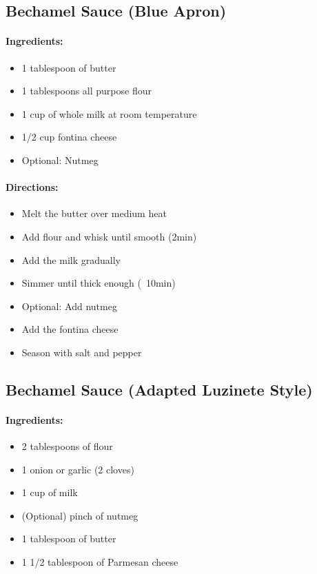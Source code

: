 \documentclass{article}
\begin{document}
\subsection{Bechamel Sauce (Blue Apron)}

\paragraph{Ingredients:}

\begin{itemize}
\item 1 tablespoon of butter
\item 1 tablespoons all purpose flour
\item 1 cup of whole milk at room temperature
\item 1/2 cup fontina cheese
\item Optional: Nutmeg
\end{itemize}

\paragraph{Directions:}
\begin{itemize}
\item Melt the butter over medium heat
\item Add flour and whisk until smooth (2min)
\item Add the milk gradually
\item Simmer until thick enough (~10min)
\item Optional: Add nutmeg
\item Add the fontina cheese
\item Season with salt and pepper
\end{itemize}

\subsection{Bechamel Sauce (Adapted Luzinete Style)}

\paragraph{Ingredients:}

\begin{itemize}
	\item 2 tablespoons of flour
	\item 1 onion or garlic (2 cloves)
	\item 1 cup of milk
	\item (Optional) pinch of nutmeg
	\item 1 tablespoon of butter
	\item 1 1/2 tablespoon of Parmesan cheese
\end{itemize}
\end{document}
